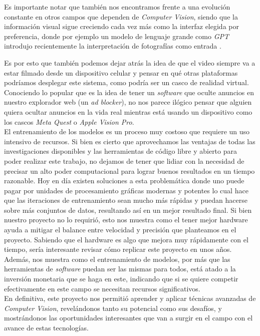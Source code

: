 \documentclass[a4paper]{article}
\begin{document}
Es importante notar que también nos encontramos frente a una evolución constante en otros campos que dependen de \textit{Computer Vision}, siendo que la información visual sigue creciendo cada vez más como la interfaz elegida por preferencia, donde por ejemplo un modelo de lenguaje grande como \textit{GPT} introdujo recientemente la interpretación de fotografías como entrada \cite{chatgpt-vision}.

Es por esto que también podemos dejar atrás la idea de que el video siempre va a estar filmado desde un dispositivo celular y pensar en qué otras plataformas podríamos desplegar este sistema, como podría ser un casco de realidad virtual. Conociendo lo popular que es la idea de tener un \textit{software} que oculte anuncios en nuestro explorador web (un \textit{ad blocker}), no nos parece ilógico pensar que alguien quiera ocultar anuncios en la vida real mientras está usando un dispositivo como los cascos \textit{Meta Quest} o \textit{Apple Vision Pro}. \\

El entrenamiento de los modelos es un proceso muy costoso que requiere un uso intensivo de recursos. Si bien es cierto que aprovechamos las ventajas de todas las investigaciones disponibles y las herramientas de código libre y abierto para poder realizar este trabajo, no dejamos de tener que lidiar con la necesidad de precisar un alto poder computacional para lograr buenos resultados en un tiempo razonable. Hoy en día existen soluciones a esta problemática donde uno puede pagar por unidades de procesamiento gráficas modernas y potentes lo cual hace que las iteraciones de entrenamiento sean mucho más rápidas y puedan hacerse sobre más conjuntos de datos, resultando así en un mejor resultado final. Si bien nuestro proyecto no lo requirió, esto nos muestra como el tener mejor hardware ayuda a mitigar el balance entre velocidad y precisión que planteamos en el proyecto. Sabiendo que el hardware es algo que mejora muy rápidamente con el tiempo, sería interesante revisar cómo replicar este proyecto en unos años. Además, nos muestra como el entrenamiento de modelos, por más que las herramientas de \textit{software} puedan ser las mismas para todos, está atado a la inversión monetaria que se haga en este, indicando que si se quiere competir efectivamente en este campo se necesitan recursos significativos. \\

En definitiva, este proyecto nos permitió aprender y aplicar técnicas avanzadas de \textit{Computer Vision}, revelándonos tanto su potencial como sus desafíos, y mostrándonos las oportunidades interesantes que van a surgir en el campo con el avance de estas tecnologías.
\end{document}
